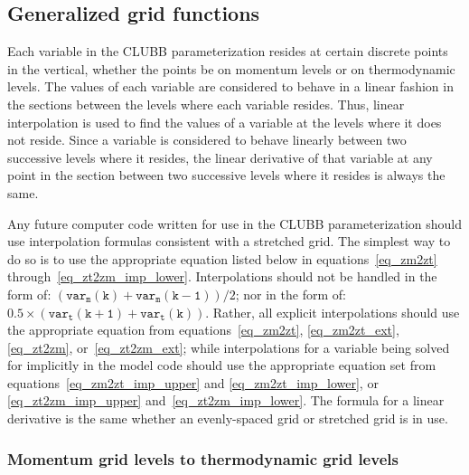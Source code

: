 \documentclass[11pt,fleqn]{article}
\begin{document}
\pagebreak

\subsection{Generalized grid functions}

Each variable in the CLUBB parameterization resides at certain discrete points 
in the vertical, whether the points be on momentum levels or on thermodynamic 
levels.  The values of each variable are considered to behave in a linear 
fashion in the sections between the levels where each variable resides.  Thus, 
linear interpolation is used to find the values of a variable at the levels 
where it does not reside.  Since a variable is considered to behave linearly 
between two successive levels where it resides, the linear derivative of that 
variable at any point in the section between two successive levels where it 
resides is always the same.

Any future computer code written for use in the CLUBB parameterization should 
use interpolation formulas consistent with a stretched grid.  The simplest way 
to do so is to use the appropriate equation listed below in 
equations~\ref{eq_zm2zt} through~\ref{eq_zt2zm_imp_lower}.  
Interpolations should not be handled in the form of:
$( \mathtt{var_m(k)} + \mathtt{var_m(k-1)} ) / 2$; nor in the form of:
$0.5 \times ( \mathtt{var_t(k+1)} + \mathtt{var_t(k)} )$.  Rather, all explicit
interpolations should use the appropriate equation from 
equations~\ref{eq_zm2zt}, \ref{eq_zm2zt_ext}, \ref{eq_zt2zm}, 
or~\ref{eq_zt2zm_ext}; while interpolations for a variable being solved for 
implicitly in the model code should use the appropriate equation set from 
equations~\ref{eq_zm2zt_imp_upper} and \ref{eq_zm2zt_imp_lower}, or 
\ref{eq_zt2zm_imp_upper} and~\ref{eq_zt2zm_imp_lower}.  The formula for a
linear derivative is the same whether an evenly-spaced grid or stretched grid
is in use.

\subsubsection{Momentum grid levels to thermodynamic grid levels}
\end{document}
